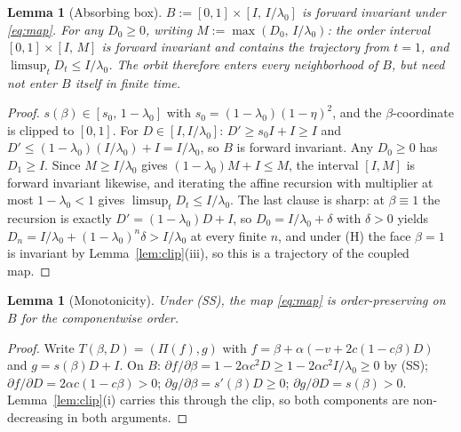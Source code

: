 \documentclass[11pt]{article}
\newtheorem{lemma}[theorem]{Lemma}
\theoremstyle{definition}
\theoremstyle{remark}
\numberwithin{equation}{section}
\begin{document}
\begin{lemma}[Absorbing box]\label{lem:box}
$B := [0,1] \times [I,\, I/\lambda_0]$ is forward invariant under \eqref{eq:map}. For any $D_0 \ge 0$, writing $M := \max(D_0,\, I/\lambda_0)$: the order interval $[0,1] \times [I,\, M]$ is forward invariant and contains the trajectory from $t = 1$, and $\limsup_t D_t \le I/\lambda_0$. The orbit therefore enters every neighborhood of $B$, but need not enter $B$ itself in finite time.
\end{lemma}
\begin{proof}
$s(\beta) \in [s_0,\, 1-\lambda_0]$ with $s_0 = (1-\lambda_0)(1-\eta)^2$, and the $\beta$-coordinate is clipped to $[0,1]$. For $D \in [I, I/\lambda_0]$: $D' \ge s_0 I + I \ge I$ and $D' \le (1-\lambda_0)(I/\lambda_0) + I = I/\lambda_0$, so $B$ is forward invariant. Any $D_0 \ge 0$ has $D_1 \ge I$. Since $M \ge I/\lambda_0$ gives $(1-\lambda_0)M + I \le M$, the interval $[I, M]$ is forward invariant likewise, and iterating the affine recursion with multiplier at most $1-\lambda_0 < 1$ gives $\limsup_t D_t \le I/\lambda_0$. The last clause is sharp: at $\beta \equiv 1$ the recursion is exactly $D' = (1-\lambda_0)D + I$, so $D_0 = I/\lambda_0 + \delta$ with $\delta > 0$ yields $D_n = I/\lambda_0 + (1-\lambda_0)^n \delta > I/\lambda_0$ at every finite $n$, and under (H) the face $\beta = 1$ is invariant by Lemma~\ref{lem:clip}(iii), so this is a trajectory of the coupled map.
\end{proof}

\begin{lemma}[Monotonicity]\label{lem:mono}
Under (SS), the map \eqref{eq:map} is order-preserving on $B$ for the componentwise order.
\end{lemma}
\begin{proof}
Write $T(\beta,D) = (\Pi(f), g)$ with $f = \beta + \alpha(-v + 2c(1-c\beta)D)$ and $g = s(\beta)D + I$. On $B$: $\partial f/\partial\beta = 1 - 2\alpha c^2 D \ge 1 - 2\alpha c^2 I/\lambda_0 \ge 0$ by (SS); $\partial f/\partial D = 2\alpha c(1-c\beta) > 0$; $\partial g/\partial\beta = s'(\beta)D \ge 0$; $\partial g/\partial D = s(\beta) > 0$. Lemma~\ref{lem:clip}(i) carries this through the clip, so both components are non-decreasing in both arguments.
\end{proof}
\end{document}
